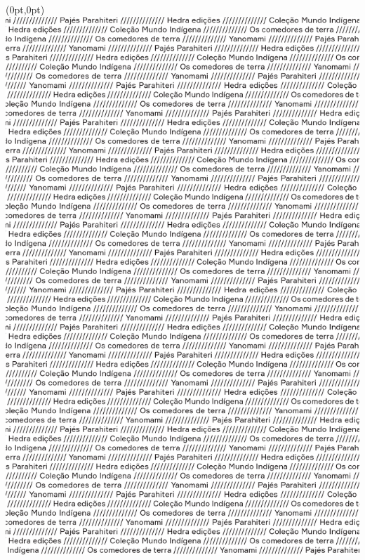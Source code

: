 \thispagestyle{empty}

\begin{textblock*}{-2in}(0pt,0pt)%
\vspace*{-1.8cm}
\hspace*{-3cm}\includegraphics[width=142mm]{./ABERTURA.png}  
\end{textblock*}

\pagebreak
\blankpage

\thispagestyle{empty}




